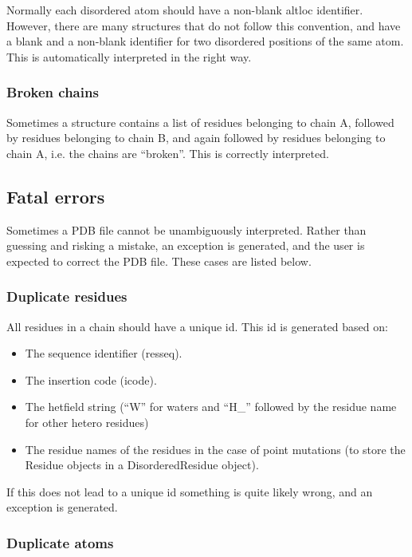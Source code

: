Normally each disordered atom should have a non-blank altloc identifier. However,
there are many structures that do not follow this convention, and have a blank
and a non-blank identifier for two disordered positions of the same atom. This
is automatically interpreted in the right way.

\subsubsection{Broken chains}

Sometimes a structure contains a list of residues belonging to chain A, followed
by residues belonging to chain B, and again followed by residues belonging to
chain A, i.e. the chains are ``broken''. This is correctly interpreted.

\subsection{Fatal errors}

Sometimes a PDB file cannot be unambiguously interpreted. Rather than guessing
and risking a mistake, an exception is generated, and the user is expected to
correct the PDB file. These cases are listed below.

\subsubsection{Duplicate residues}

All residues in a chain should have a unique id. This id is generated based
on:

\begin{itemize}
\item The sequence identifier (resseq).
\item The insertion code (icode).
\item The hetfield string (``W'' for waters and ``H\_'' followed by the
residue name for other hetero residues)
\item The residue names of the residues in the case of point mutations (to store the
Residue objects in a DisorderedResidue object).
\end{itemize}
If this does not lead to a unique id something is quite likely wrong, and an
exception is generated.

\subsubsection{Duplicate atoms}

